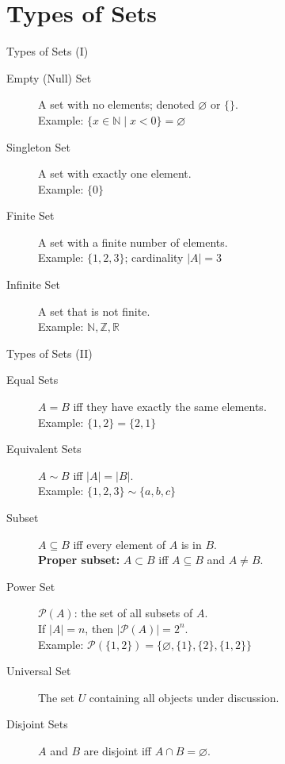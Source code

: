 \documentclass{beamer}
\begin{document}
\section{Types of Sets}
\begin{frame}{Types of Sets (I)}
  \begin{description}
    \item[Empty (Null) Set] A set with no elements; denoted
      $\varnothing$ or $\{\}$.
      \\ Example: $\{x \in \mathbb{N} \mid x < 0\} = \varnothing$
    \pause
    \item[Singleton Set] A set with exactly one element.
      \\ Example: $\{0\}$
    \pause
    \item[Finite Set] A set with a finite number of elements.
      \\ Example: $\{1,2,3\}$; cardinality $|A| = 3$
    \pause
    \item[Infinite Set] A set that is not finite.
      \\ Example: $\mathbb{N}, \mathbb{Z}, \mathbb{R}$
  \end{description}
\end{frame}

\begin{frame}{Types of Sets (II)}
  \begin{description}
    \item[Equal Sets] $A = B$ iff they have exactly the same elements.
      \\ Example: $\{1,2\} = \{2,1\}$
    \pause
    \item[Equivalent Sets] $A \sim B$ iff $|A| = |B|$.
      \\ Example: $\{1,2,3\} \sim \{a,b,c\}$
    \pause
    \item[Subset] $A \subseteq B$ iff every element of $A$ is in $B$.
      \\ \textbf{Proper subset:} $A \subset B$ iff $A \subseteq B$ and
      $A \ne B$.
    \pause
    \item[Power Set] $\mathcal{P}(A)$: the set of all subsets of $A$.
      \\ If $|A| = n$, then $|\mathcal{P}(A)| = 2^n$.
      \\ Example: $\mathcal{P}(\{1,2\}) =
         \{\varnothing, \{1\}, \{2\}, \{1,2\}\}$
    \pause
    \item[Universal Set] The set $U$ containing all objects under
      discussion.
    \pause
    \item[Disjoint Sets] $A$ and $B$ are disjoint iff
      $A \cap B = \varnothing$.
  \end{description}
\end{frame}
\end{document}
